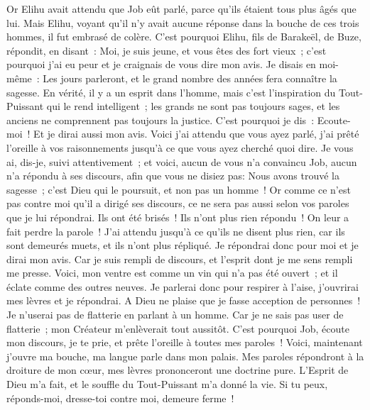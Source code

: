 \begin{multicols}{2}
Or Elihu avait attendu que Job eût parlé, parce qu'ils étaient tous plus âgés que lui.
Mais Elihu, voyant qu'il n'y avait aucune réponse dans la bouche de ces trois hommes, il fut embrasé de colère.
C'est pourquoi Elihu, fils de Barakeël, de Buze, répondit, en disant~: Moi, je suis jeune, et vous êtes des fort vieux~; c'est pourquoi j'ai eu peur et je craignais de vous dire mon avis.
Je disais en moi-même~: Les jours parleront, et le grand nombre des années fera connaître la sagesse.
En vérité, il y a un esprit dans l'homme, mais c'est l'inspiration du Tout-Puissant qui le rend intelligent~;
les grands ne sont pas toujours sages, et les anciens ne comprennent pas toujours la justice.
C'est pourquoi je dis~: Ecoute-moi~! Et je dirai aussi mon avis.
Voici j'ai attendu que vous ayez parlé, j'ai prêté l'oreille à vos raisonnements jusqu'à ce que vous ayez cherché quoi dire.
Je vous ai, dis-je, suivi attentivement~; et voici, aucun de vous n'a convaincu Job, aucun n'a répondu à ses discours,
afin que vous ne disiez pas: Nous avons trouvé la sagesse~; c'est Dieu qui le poursuit, et non pas un homme~!
Or comme ce n'est pas contre moi qu'il a dirigé ses discours, ce ne sera pas aussi selon vos paroles que je lui répondrai.
Ils ont été brisés~! Ils n'ont plus rien répondu~! On leur a fait perdre la parole~!
J'ai attendu jusqu'à ce qu'ils ne disent plus rien, car ils sont demeurés muets, et ils n'ont plus répliqué.
Je répondrai donc pour moi et je dirai mon avis.
Car je suis rempli de discours, et l'esprit dont je me sens rempli me presse.
Voici, mon ventre est comme un vin qui n'a pas été ouvert~; et il éclate comme des outres neuves.
Je parlerai donc pour respirer à l'aise, j'ouvrirai mes lèvres et je répondrai.
A Dieu ne plaise que je fasse acception de personnes~! Je n'userai pas de flatterie en parlant à un homme.
Car je ne sais pas user de flatterie~; mon Créateur m'enlèverait tout aussitôt.
\VerseOne{}C'est pourquoi Job, écoute mon discours, je te prie, et prête l'oreille à toutes mes paroles~!
Voici, maintenant j'ouvre ma bouche, ma langue parle dans mon palais.
Mes paroles répondront à la droiture de mon cœur, mes lèvres prononceront une doctrine pure.
L'Esprit de Dieu m'a fait, et le souffle du Tout-Puissant m'a donné la vie.
Si tu peux, réponds-moi, dresse-toi contre moi, demeure ferme~!

\end{multicols}
